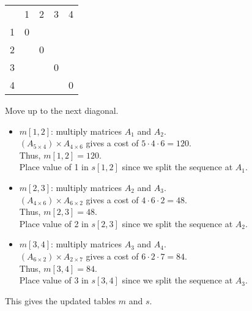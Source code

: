 \documentclass{article}
\begin{document}
\begin{center}
\label*{$m$}
\begin{tabular}{ c|c|c|c|c| }
    \multicolumn{1}{c}{}
    & \multicolumn{1}{c}{1}
    & \multicolumn{1}{c}{2}
    & \multicolumn{1}{c}{3}
    & \multicolumn{1}{c}{4}\\

    \cline{2-5}
        1 & 0 &  &  &  \\
    \cline{2-5}
        2 &  & 0 &  &  \\
    \cline{2-5}
        3 &  &  & 0 &  \\
    \cline{2-5}
        4 &  &  &  & 0 \\
    \cline{2-5}
\end{tabular}
\end{center}

Move up to the next diagonal.
\begin{itemize}
    \item $m[1, 2]$: multiply matrices $A_1$ and $A_2$.\\
    $(A_{5 \times 4}) \times A_{4 \times 6}$ gives a cost of $5 \cdot 4 \cdot 6 = 120$. \\
    Thus, $m[1, 2] = 120$.\\
    Place value of 1 in $s[1, 2]$ since we split the sequence at $A_1$.
    
    \item $m[2, 3]$: multiply matrices $A_2$ and $A_3$.\\
    $(A_{4 \times 6}) \times A_{6 \times 2}$ gives a cost of $4 \cdot 6 \cdot 2 = 48$. \\
    Thus, $m[2, 3] = 48$.\\
    Place value of 2 in $s[2, 3]$ since we split the sequence at $A_2$.
    
    \item $m[3, 4]$: multiply matrices $A_3$ and $A_4$.\\
    $(A_{6 \times 2}) \times A_{2 \times 7}$ gives a cost of $6 \cdot 2 \cdot 7 = 84$. \\
    Thus, $m[3, 4] = 84$.\\
    Place value of 3 in $s[3, 4]$ since we split the sequence at $A_3$.
\end{itemize}

\newpage

This gives the updated tables $m$ and $s$.
\end{document}
